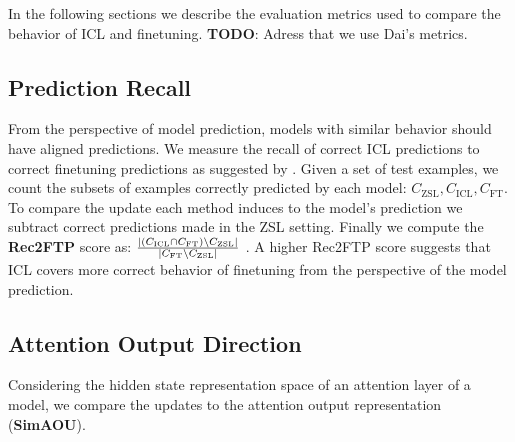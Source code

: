 In the following sections we describe the evaluation metrics used to compare the behavior of ICL and finetuning.
\textbf{TODO}: Adress that we use Dai's metrics.

\subsection*{Prediction Recall}

From the perspective of model prediction, models with similar behavior should have aligned predictions.
We measure the recall of correct ICL predictions to correct finetuning predictions as suggested by \cite{dai2023gpt}.
Given a set of test examples, we count the subsets of examples correctly predicted by each model: $C_{\text{ZSL}}, C_{\text{ICL}}, C_{\text{FT}}$.
To compare the update each method induces to the model's prediction we subtract correct predictions made in the ZSL setting.
Finally we compute the \textbf{Rec2FTP} score as: $\frac{ \left| \left( C_{\text{ICL}} \cap C_{\text{FT}} \right) \setminus C_{\text{ZSL}} \right| }{ \left| C_{\text{FT}} \setminus C_{\text{ZSL}} \right| }$ .
A higher Rec2FTP score suggests that ICL covers more correct behavior of finetuning from the perspective of the model prediction.


\subsection*{Attention Output Direction}
Considering the hidden state representation space of an attention layer of a model, we compare the updates to the attention output representation (\textbf{SimAOU})\cite{dai2023gpt}.
